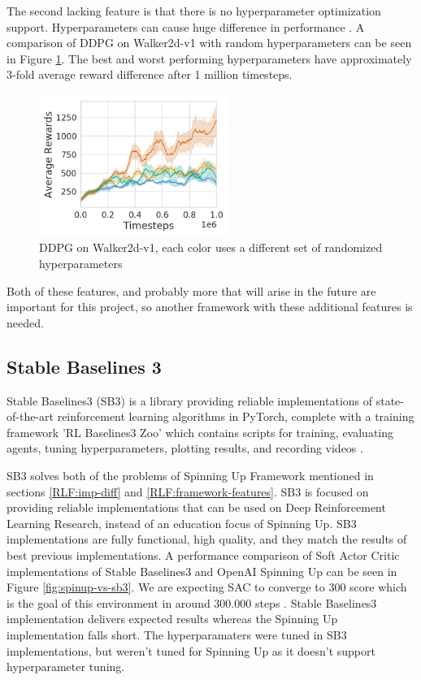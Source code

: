 \documentclass[12pt,twoside]{report}
\begin{document}
The second lacking feature is that there is no hyperparameter optimization support. Hyperparameters can cause huge difference in performance \cite{hyperparameter-ddpg}. A comparison of DDPG on Walker2d-v1 with random hyperparameters can be seen in Figure \ref{fig:hyperparameter-ddpg}. The best and worst performing hyperparameters have approximately 3-fold average reward difference after 1 million timesteps.

\begin{figure}[h]
\centering
\includegraphics[width = 0.55\textwidth]{figures/rl-framework/hyperparameter-ddpg.png}
\caption{DDPG on Walker2d-v1, each color uses a different set of randomized hyperparameters \cite{hyperparameter-ddpg}}
\label{fig:hyperparameter-ddpg}
\end{figure}

Both of these features, and probably more that will arise in the future are important for this project, so another framework with these additional features is needed.


\subsection{Stable Baselines 3}
Stable Baselines3 (SB3) is a library providing reliable implementations of state-of-the-art reinforcement learning algorithms in PyTorch, complete with a training framework 'RL Baselines3 Zoo' which contains scripts for training, evaluating agents, tuning hyperparameters, plotting results, and recording videos \cite{stable-baselines3}.

SB3 solves both of the problems of Spinning Up Framework mentioned in sections \ref{RLF:imp-diff} and \ref{RLF:framework-features}. SB3 is focused on providing reliable implementations that can be used on Deep Reinforcement Learning Research, instead of an education focus of Spinning Up. SB3 implementations are fully functional, high quality, and they match the results of best previous implementations. A performance comparison of Soft Actor Critic implementations of Stable Baselines3 and OpenAI Spinning Up can be seen in Figure \ref{fig:spinup-vs-sb3}. We are expecting SAC to converge to 300 score which is the goal of this environment \cite{Bipedal-Walker-v2} in around 300.000 steps \cite{gym-leaderboard}. Stable Baselines3 implementation delivers expected results whereas the Spinning Up implementation falls short. The hyperparamaters were tuned in SB3 implementations, but weren't tuned for Spinning Up as it doesn't support hyperparameter tuning.
\end{document}
